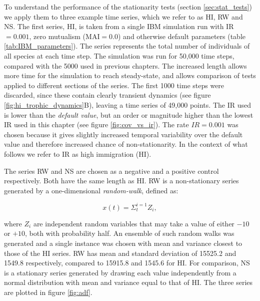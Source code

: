 To understand the performance of the stationarity tests (section \ref{sec:stat_tests}) we apply them to three example time series, which we refer to as HI, RW and NS. The first series, HI, is taken from a single IBM simulation run with  IR$=0.001$, zero mutualism (MAI$=0.0$) and otherwise default parameters (table \ref{tab:IBM_parameters}).  The series represents the total number of individuals of all species at each time step. The simulation was run for 50,000 time steps, compared with the 5000 used in previous chapters. The increased length allows more time for the simulation to reach steady-state, and allows comparison of tests applied to different sections of the series. The first 1000 time steps were discarded, since these contain clearly transient dynamics (see figure \ref{fig:hi_trophic_dynamics}B), leaving a time series of 49,000 points. The IR used is lower than the \emph{default value}, but an order or magnitude higher than the lowest IR used in this chapter (see figure \ref{fig:cov_vs_ir}). The rate $IR=0.001$ was chosen because it gives slightly increased temporal variability over the default value and therefore increased chance of non-stationarity. In the context of what follows we refer to IR as high immigration (HI).


The series RW and NS are chosen as a negative and a positive control respectively. Both have the same length as HI. RW is a non-stationary series generated by a one-dimensional \emph{random-walk}, defined as:

\begin{equation}
	x(t) = \Sigma_{t}^{i=1} Z_i, 
\end{equation}   

where $Z_i$ are independent random variables that may take a value of either $-10$ or $+10$, both with probability half. An ensemble of such random walks was generated and a single instance was chosen with mean and variance closest to those of the HI series. RW has mean and standard deviation of 15525.2 and 1549.8 respectively, compared to 15915.8 and 1545.6 for HI. For comparison, NS is a stationary series generated by drawing each value independently from a normal distribution with mean and variance  equal to that of HI. The three series are plotted in figure \ref{fig:adf}.
  
